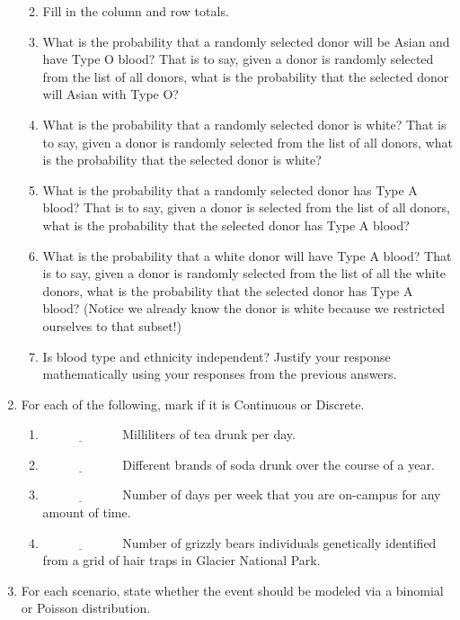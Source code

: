 \documentclass[]{book}
\providecommand{\tightlist}{%
  \setlength{\itemsep}{0pt}\setlength{\parskip}{0pt}}
\begin{document}
\begin{enumerate}
  \begin{enumerate}
  \def\labelenumii{\alph{enumii})}
  \tightlist
  \item
    Fill in the column and row totals.
  \item
    What is the probability that a randomly selected donor will be Asian
    and have Type O blood? That is to say, given a donor is randomly
    selected from the list of all donors, what is the probability that
    the selected donor will Asian with Type O?
  \item
    What is the probability that a randomly selected donor is white?
    That is to say, given a donor is randomly selected from the list of
    all donors, what is the probability that the selected donor is
    white?
  \item
    What is the probability that a randomly selected donor has Type A
    blood? That is to say, given a donor is selected from the list of
    all donors, what is the probability that the selected donor has Type
    A blood?
  \item
    What is the probability that a white donor will have Type A blood?
    That is to say, given a donor is randomly selected from the list of
    all the white donors, what is the probability that the selected
    donor has Type A blood? (Notice we already know the donor is white
    because we restricted ourselves to that subset!)
  \item
    Is blood type and ethnicity independent? Justify your response
    mathematically using your responses from the previous answers.
  \end{enumerate}
\item
  For each of the following, mark if it is Continuous or Discrete.

  \begin{enumerate}
  \def\labelenumii{\alph{enumii})}
  \tightlist
  \item
    \(\underline{\hspace{1in}}\) Milliliters of tea drunk per day.
  \item
    \(\underline{\hspace{1in}}\) Different brands of soda drunk over the
    course of a year.
  \item
    \(\underline{\hspace{1in}}\) Number of days per week that you are
    on-campus for any amount of time.
  \item
    \(\underline{\hspace{1in}}\) Number of grizzly bears individuals
    genetically identified from a grid of hair traps in Glacier National
    Park.
  \end{enumerate}
\item
  For each scenario, state whether the event should be modeled via a
  binomial or Poisson distribution.


\end{enumerate}
\end{document}
